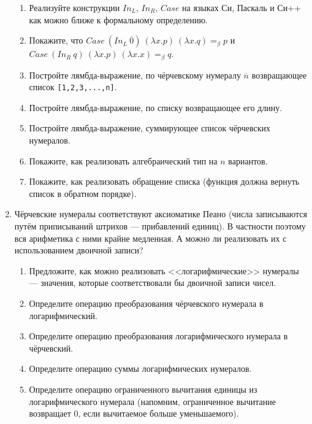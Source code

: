 \documentclass[10pt,a4paper,oneside]{article}
\begin{document}
\begin{enumerate}
\begin{enumerate}
\item Реализуйте конструкции $In_L$, $In_R$, $Case$ на языках Си, Паскаль и Си++ как можно
ближе к формальному определению.
\item Покажите, что $Case\ (In_L\ \overline{0})\ (\lambda x.p)\ (\lambda x.q) =_\beta p$ и 
                    $Case\ (In_R\ q)\ (\lambda x.p)\ (\lambda x.x) =_\beta q$.
\item Постройте лямбда-выражение, по чёрчевскому нумералу $\overline{n}$ возвращающее список \verb![1,2,3,...,n]!.
\item Постройте лямбда-выражение, по списку возвращающее его длину.
\item Постройте лямбда-выражение, суммирующее список чёрчевских нумералов.
\item Покажите, как реализовать алгебраический тип на $n$ вариантов.
\item Покажите, как реализовать обращение списка (функция должна вернуть список в обратном порядке).
\end{enumerate}

\item Чёрчевские нумералы соответствуют аксиоматике Пеано (числа записываются путём приписываний
штрихов --- прибавлений единиц). В частности поэтому вся арифметика с ними крайне медленная.
А можно ли реализовать их с использованием двоичной записи?

\begin{enumerate} 
\item Предложите, как можно реализовать <<логарифмические>> нумералы --- значения,
которые соответствовали бы двоичной записи чисел.
\item Определите операцию преобразования чёрчевского нумерала в логарифмический.
\item Определите операцию преобразования логарифмического нумерала в чёрчевский.
\item Определите операцию суммы логарифмических нумералов.
\item Определите операцию ограниченного вычитания единицы из логарифмического нумерала
(напомним, ограниченное вычитание возвращает 0, если вычитаемое больше уменьшаемого).
\end{enumerate}

\end{enumerate}
\end{document}
